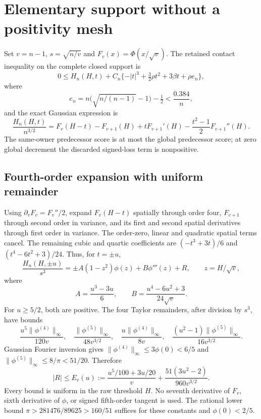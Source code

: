 \documentclass[11pt]{article}
\begin{document}
\section{Elementary support without a positivity mesh}
Set $v=n-1$, $s=\sqrt{n/v}$ and $F_v(x)=\Phi(x/\sqrt v)$. The retained
contact inequality on the complete closed support is
\begin{equation}\label{contact}
 0\le H_n(H,t)+C_n\{-|t|^3+\tfrac32\rho t^2+3\beta t+\rho e_n\},
\end{equation}
where
\[
 e_n=n\bigl(\sqrt{n/(n-1)}-1\bigr)-\tfrac12<\frac{0.384}{n},
\]
and the exact Gaussian expression is
\[
 \frac{H_n(H,t)}{n^{3/2}}
 =F_v(H-t)-F_{v+1}(H)+tF_{v+1}'(H)
       -\frac{t^2-1}{2}F_{v+1}''(H).
\]
The same-owner predecessor score is at most the global predecessor score;
at zero global decrement the discarded signed-loss term is nonpositive.

\subsection{Fourth-order expansion with uniform remainder}
Using $\partial_vF_v=F_v''/2$, expand $F_v(H-t)$ spatially through order
four, $F_{v+1}$ through second order in variance, and its first and second
spatial derivatives through first order in variance. The order-zero, linear
and quadratic spatial terms cancel. The remaining cubic and quartic
coefficients are $(-t^3+3t)/6$ and $(t^4-6t^2+3)/24$. Thus, for $t=\pm u$,
\begin{equation}\label{expansion}
 \frac{H_n(H,\pm u)}{s^3}
  =\pm A(1-z^2)\phi(z)+B\phi'''(z)+R,\qquad z=H/\sqrt v,
\end{equation}
where
\[
 A=\frac{u^3-3u}{6},\qquad B=\frac{u^4-6u^2+3}{24\sqrt v}.
\]
For $u\ge5/2$, both are positive. The four Taylor remainders, after division
by $s^3$, have bounds
\[
 \frac{u^5\|\phi^{(4)}\|_\infty}{120v},\quad
 \frac{\|\phi^{(5)}\|_\infty}{48v^{3/2}},\quad
 \frac{u\|\phi^{(4)}\|_\infty}{8v},\quad
 \frac{(u^2-1)\|\phi^{(5)}\|_\infty}{16v^{3/2}}.
\]
Gaussian Fourier inversion gives
$\|\phi^{(4)}\|_\infty\le3\phi(0)<6/5$ and
$\|\phi^{(5)}\|_\infty\le8/\pi<51/20$. Therefore
\begin{equation}\label{error}
 |R|\le E_v(u):=\frac{u^5/100+3u/20}{v}
       +\frac{51(3u^2-2)}{960v^{3/2}}.
\end{equation}
Every bound is uniform in the raw threshold $H$. No seventh derivative
of $F_v$, sixth derivative of $\phi$, or signed fifth-order tangent is used.
The rational lower bound $\pi>281476/89625>160/51$ suffices for these
constants and $\phi(0)<2/5$.
\end{document}
